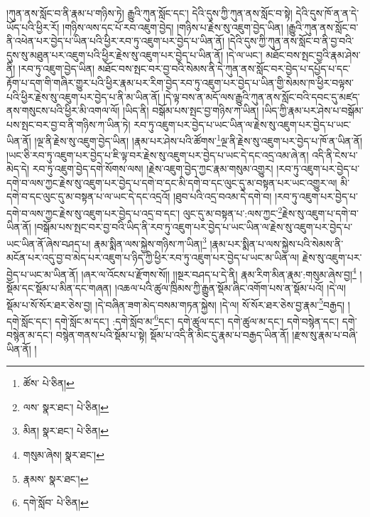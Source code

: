 །ཀུན་ནས་སློང་བ་ནི་རྣམ་པ་གཉིས་ཏེ། རྒྱུའི་ཀུན་སློང་དང་། དེའི་དུས་ཀྱི་ཀུན་ནས་སློང་བ་སྟེ། དེའི་དུས་ཁོ་ན་ན་དེ་ཡོད་པའི་ཕྱིར་རོ། །གཉིས་ལས་དང་པོ་རབ་འཇུག་བྱེད། །གཉིས་པ་རྗེས་སུ་འཇུག་བྱེད་ཡིན། །རྒྱུའི་ཀུན་ནས་སློང་བ་ནི་འཕེན་པར་བྱེད་པ་ཡིན་པའི་ཕྱིར་རབ་ཏུ་འཇུག་པར་བྱེད་པ་ཡིན་ནོ། །དེའི་དུས་ཀྱི་ཀུན་ནས་སློང་བ་ནི་བྱ་བའི་དུས་སུ་མཐུན་པར་འཇུག་པའི་ཕྱིར་རྗེས་སུ་འཇུག་པར་བྱེད་པ་ཡིན་ནོ། །དེ་ལ་ཡང་། མཐོང་བས་སྤང་བྱའི་རྣམ་ཤེས་ནི། །རབ་ཏུ་འཇུག་བྱེད་ཡིན། མཐོང་བས་སྤང་བར་བྱ་བའི་སེམས་ནི་དེ་ཀུན་ནས་སློང་བར་བྱེད་པ་དཔྱོད་པ་དང་རྟོག་པ་དག་གི་གཞིར་གྱུར་པའི་ཕྱིར་རྣམ་པར་རིག་བྱེད་རབ་ཏུ་འཇུག་པར་བྱེད་པ་ཡིན་གྱི་སེམས་ཁ་ཕྱིར་བལྟས་པའི་ཕྱིར་རྗེས་སུ་འཇུག་པར་བྱེད་པ་ནི་མ་ཡིན་ནོ། །དེ་ལྟ་བས་ན་མདོ་ལས་རྒྱུའི་ཀུན་ནས་སློང་བའི་དབང་དུ་མཛད་ནས་གསུངས་པའི་ཕྱིར་མི་འགལ་ལོ། །ཡིད་ནི། བསྒོམ་པས་སྤང་བྱ་གཉིས་ཀ་ཡིན། །ཡིད་ཀྱི་རྣམ་པར་ཤེས་པ་བསྒོམ་པས་སྤང་བར་བྱ་བ་ནི་གཉིས་ཀ་ཡིན་ཏེ། རབ་ཏུ་འཇུག་པར་བྱེད་པ་ཡང་ཡིན་ལ་རྗེས་སུ་འཇུག་པར་བྱེད་པ་ཡང་ཡིན་ནོ། །ལྔ་ནི་རྗེས་སུ་འཇུག་བྱེད་ཡིན། །རྣམ་པར་ཤེས་པའི་ཚོགས་\footnote{ཚོས་  པེ་ཅིན། }ལྔ་ནི་རྗེས་སུ་འཇུག་པར་བྱེད་པ་ཁོ་ན་ཡིན་ནོ། །ཡང་ཅི་རབ་ཏུ་འཇུག་པར་བྱེད་པ་ཇི་ལྟ་བར་རྗེས་སུ་འཇུག་པར་བྱེད་པ་ཡང་དེ་དང་འདྲ་འམ་ཞེ་ན། འདི་ནི་ངེས་པ་མེད་དེ། རབ་ཏུ་འཇུག་བྱེད་དགེ་སོགས་ལས། །རྗེས་འཇུག་བྱེད་ཀྱང་རྣམ་གསུམ་འགྱུར། །རབ་ཏུ་འཇུག་པར་བྱེད་པ་དགེ་བ་ལས་ཀྱང་རྗེས་སུ་འཇུག་པར་བྱེད་པ་དགེ་བ་དང་མི་དགེ་བ་དང་ལུང་དུ་མ་བསྟན་པར་ཡང་འགྱུར་ལ། མི་དགེ་བ་དང་ལུང་དུ་མ་བསྟན་པ་ལ་ཡང་དེ་དང་འདྲའོ། །ཐུབ་པའི་འདྲ་བའམ་དེ་དགེ་བ། །རབ་ཏུ་འཇུག་པར་བྱེད་པ་དགེ་བ་ལས་ཀྱང་རྗེས་སུ་འཇུག་པར་བྱེད་པ་འདྲ་བ་དང་། ལུང་དུ་མ་བསྟན་པ་:ལས་ཀྱང་\footnote{ལས་  སྣར་ཐང་།  པེ་ཅིན། }རྗེས་སུ་འཇུག་པ་དགེ་བ་ཡིན་ནོ། །བསྒོམ་པས་སྤང་བར་བྱ་བའི་ཡིད་ནི་རབ་ཏུ་འཇུག་པར་བྱེད་པ་ཡང་ཡིན་ལ་རྗེས་སུ་འཇུག་པར་བྱེད་པ་ཡང་ཡིན་ནོ་ཞེས་བཤད་པ། རྣམ་སྨིན་ལས་སྐྱེས་གཉིས་ཀ་ཡིན།\footnote{མིན།  སྣར་ཐང་།  པེ་ཅིན། } །རྣམ་པར་སྨིན་པ་ལས་སྐྱེས་པའི་སེམས་ནི་མངོན་པར་འདུ་བྱ་བ་མེད་པར་འཇུག་པ་ཉིད་ཀྱི་ཕྱིར་རབ་ཏུ་འཇུག་པར་བྱེད་པ་ཡང་མ་ཡིན་ལ། རྗེས་སུ་འཇུག་པར་བྱེད་པ་ཡང་མ་ཡིན་ནོ། །ཞར་ལ་འོངས་པ་རྫོགས་སོ།། །།སྔར་བཤད་པ་དེ་ནི། རྣམ་རིག་མིན་རྣམ་:གསུམ་ཞེས་བྱ།\footnote{གསུམ་ཞེས།  སྣར་ཐང་། } །སྡོམ་དང་སྡོམ་པ་མིན་དང་གཞན། །འཆལ་པའི་ཚུལ་ཁྲིམས་ཀྱི་རྒྱུན་སྡོམ་ཞིང་འགོག་པས་ན་སྡོམ་པའོ། །དེ་ལ། སྡོམ་པ་སོ་སོར་ཐར་ཅེས་བྱ། །དེ་བཞིན་ཟག་མེད་བསམ་གཏན་སྐྱེས། །དེ་ལ། སོ་སོར་ཐར་ཅེས་བྱ་རྣམ་\footnote{རྣམས་  སྣར་ཐང་། }བརྒྱད། །དགེ་སློང་དང་། དགེ་སློང་མ་དང་། :དགེ་སློབ་མ་\footnote{དགེ་སློབ་  པེ་ཅིན། }དང་། དགེ་ཚུལ་དང་། དགེ་ཚུལ་མ་དང་། དགེ་བསྙེན་དང་། དགེ་བསྙེན་མ་དང་། བསྙེན་གནས་པའི་སྡོམ་པ་སྟེ། སྡོམ་པ་འདི་ནི་མིང་དུ་རྣམ་པ་བརྒྱད་ཡིན་ནོ། །རྫས་སུ་རྣམ་པ་བཞི་ཡིན་ནོ། །
